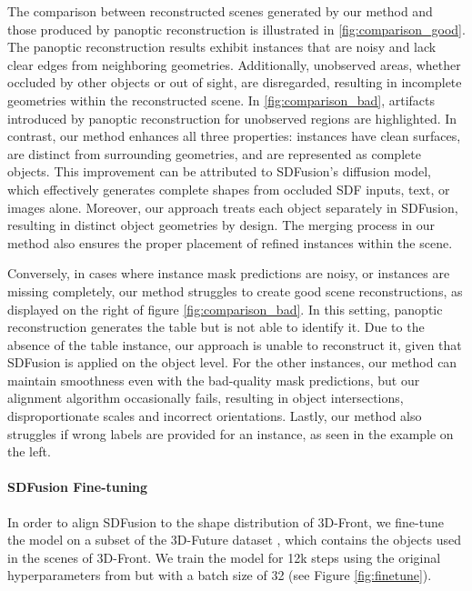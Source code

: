 The comparison between reconstructed scenes generated by our method and those produced by panoptic reconstruction is illustrated in \ref{fig:comparison_good}.
The panoptic reconstruction results exhibit instances that are noisy and lack clear edges from neighboring geometries.
Additionally, unobserved areas, whether occluded by other objects or out of sight, are disregarded, resulting in incomplete geometries within the reconstructed scene.
In \ref{fig:comparison_bad}, artifacts introduced by panoptic reconstruction for unobserved regions are highlighted.
In contrast, our method enhances all three properties: instances have clean surfaces, are distinct from surrounding geometries, and are represented as complete objects.
This improvement can be attributed to SDFusion's diffusion model, which effectively generates complete shapes from occluded SDF inputs, text, or images alone.
Moreover, our approach treats each object separately in SDFusion, resulting in distinct object geometries by design. The merging process in our method also ensures the proper placement of refined instances within the scene.

Conversely, in cases where instance mask predictions are noisy, or instances are missing completely, our method struggles to create good scene reconstructions, as displayed on the right of figure \ref{fig:comparison_bad}. In this setting, panoptic reconstruction generates the table but is not able to identify it. Due to the absence of the table instance, our approach is unable to reconstruct it, given that SDFusion is applied on the object level. For the other instances, our method can maintain smoothness even with the bad-quality mask predictions, but our alignment algorithm occasionally fails, resulting in object intersections, disproportionate scales and incorrect orientations. Lastly, our method also struggles if wrong labels are provided for an instance, as seen in the example on the left.



\paragraph{SDFusion Fine-tuning}
In order to align SDFusion to the shape distribution of 3D-Front, we fine-tune the model on a subset of the 3D-Future dataset \citep{fu20213e}, which contains the objects used in the scenes of 3D-Front.
We train the model for 12k steps using the original hyperparameters from \citet{cheng2023sdfusion} but with a batch size of 32 (see Figure \ref{fig:finetune}).

